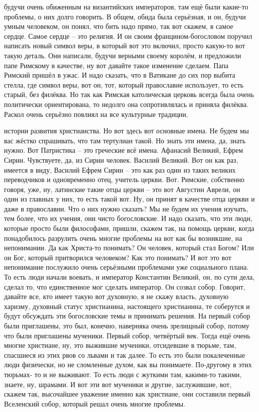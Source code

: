 будучи очень обиженным на византийских императоров, там ещё были какие-то
проблемы, о них долго говорить. В общем, обида была серьёзная, и он, будучи
умным человеком, он понял, что бить надо прямо, так вот скажем, в самое сердце.
Самое сердце – это религия. И он своим францином-богословом поручил написать
новый символ веры, в который вот это включил, просто какую-то вот такую деталь.
Они написали, будучи верными своему королём, и предложили папе Римскому в
качестве, ну вот давайте такое изменение сделаем. Папа Римский пришёл в ужас. И
надо сказать, что в Ватикане до сих пор выбита стелла, где символ веры, вот он,
тот, который православие использует, то есть старый, без филёква. Но так как
Римская католическая церковь всегда была очень политически ориентирована, то
недолго она сопротивлялась и приняла филёква. 
Раскол очень серьёзно повлиял на все культурные традиции. 

истории развития
христианства. Но вот здесь вот основные имена. Не будем мы вас жёстко
спрашивать, что там тертулиан такой. Но знать эти имена, да, знать нужно. Вот
Патристика – это греческие всё имена. Афанасий Великий, Ефрем Сирин. Чувствуете,
да, из Сирии человек. Василий Великий. Вот он как раз, имеется в виду, Василий
Ефрем Сирин – это как раз один из таких великих переводчиков и одновременно
отец, учитель церкви. Вот. Римские, собственно говоря, уже, ну, латинские такие
отцы церкви – это вот Августин Аврели, он один из главных у них, то есть такой
вот. Ну, он принят в качестве отца церкви и даже в православии. Что о них нужно
сказать? Мы не будем их учения изучать, тем более, что их учения, они чисто
богословские. И надо сказать, что эти люди, которые просто были философами,
пришли, скажем так, на помощь церкви, когда понадобилось разрулить очень многие
проблемы на вот как бы возникшие, на непонимании. Да как Христа-то понимать? Он
человек, который стал Богом? Или он Бог, который притворился человеком? Как это
понимать? И вот это вот непонимание послужило очень серьёзными проблемами уже
социального плана. То есть люди начали воевать, и император Константин Великий,
он, по сути дела, сделал то, что единственное мог сделать император. Он созвал
собор. Говорит, давайте все, кто имеет такую вот духовную, я не скажу власть,
духовную харизму, духовный статус христианина, настоящего христианина, те
соберутся и будут обсуждать эти богословские темы и принимать решения. На первый
собор были приглашены, это был, конечно, наверняка очень зрелищный собор, потому
что были приглашены мученики. Первый собор, четвёртый век. Тогда ещё очень
многие христиане, ну, это выжившие мученики, отсидевшие в тюрьме, там, спасшиеся
из этих рвов со львами и так далее. То есть это были покалеченные люди
физически, но не сломленные духом, как вы понимаете. По-другому в этих тюрьмах-
то и не выживают. То есть люди с жуткими там, какими-то такими, знаете, ну,
шрамами. И вот эти вот мученики и другие, заслужившие, вот, скажем так,
высочайшее уважение именно как христиане, они составили первый Вселенский собор,
который решал очень многие проблемы. 

